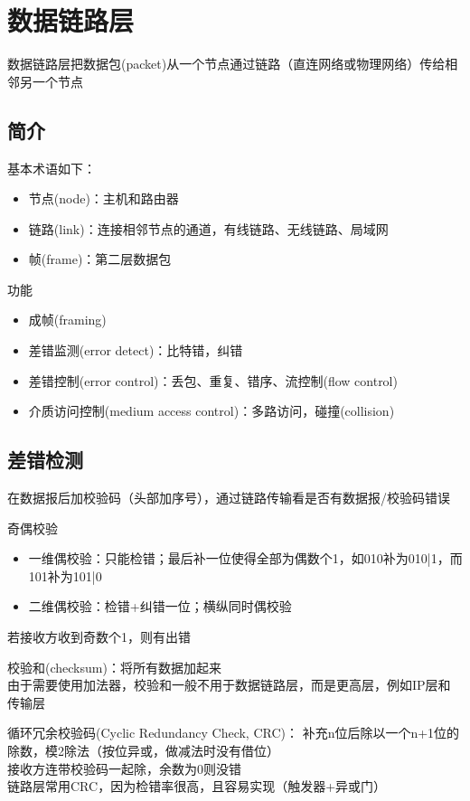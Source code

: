 
\section{数据链路层}
数据链路层把数据包(packet)从一个节点通过链路（直连网络或物理网络）传给相邻另一个节点

\subsection{简介}
基本术语如下：
\begin{itemize}
	\item 节点(node)：主机和路由器
	\item 链路(link)：连接相邻节点的通道，有线链路、无线链路、局域网
	\item 帧(frame)：第二层数据包
\end{itemize}

功能
\begin{itemize}
	\item 成帧(framing)
	\item 差错监测(error detect)：比特错，纠错
	\item 差错控制(error control)：丢包、重复、错序、流控制(flow control)
	\item 介质访问控制(medium access control)：多路访问，碰撞(collision)
\end{itemize}

\subsection{差错检测}
在数据报后加校验码（头部加序号），通过链路传输看是否有数据报/校验码错误

奇偶校验
\begin{itemize}
	\item 一维偶校验：只能检错；最后补一位使得全部为偶数个1，如010补为010|1，而101补为101|0
	\item 二维偶校验：检错+纠错一位；横纵同时偶校验
\end{itemize}
若接收方收到奇数个1，则有出错

校验和(checksum)：将所有数据加起来\\
由于需要使用加法器，校验和一般不用于数据链路层，而是更高层，例如IP层和传输层

循环冗余校验码(Cyclic Redundancy Check, CRC)：
补充n位后除以一个n+1位的除数，模2除法（按位异或，做减法时没有借位）\\
接收方连带校验码一起除，余数为0则没错\\
链路层常用CRC，因为检错率很高，且容易实现（触发器+异或门）

